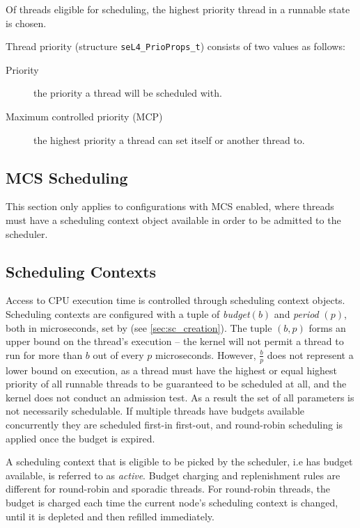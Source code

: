 Of threads eligible for scheduling, the highest priority thread in a runnable state is chosen.

Thread priority (structure \texttt{seL4\_PrioProps\_t}) consists of two values as follows:

\begin{description} \item[Priority] the priority a thread will be scheduled with.  \item[Maximum
controlled priority (MCP)] the highest priority a thread can set itself or another thread to.
\end{description}

\subsection{MCS Scheduling}

This section only applies to configurations with MCS enabled, where threads must have
a scheduling context object available in order to be admitted to the scheduler.

\subsection{Scheduling Contexts}
\label{sec:scheduling_contexts}

Access to CPU execution time is controlled through scheduling context objects.
Scheduling contexts are configured with a tuple of
\textit{budget}$(b)$ and \textit{period} $(p)$, both in microseconds, set by
 (see \autoref{sec:sc_creation}).
The tuple $(b, p)$ forms an upper bound on the thread's execution -- the kernel will not permit a
thread to run for more than $b$ out of every $p$ microseconds. However, $\frac{b}{p}$ does not
represent a lower bound on execution, as a thread must have the highest or equal highest priority
of all runnable threads to be guaranteed to be scheduled at all, and the kernel does not conduct
an admission test. As a result the set of all parameters is not necessarily schedulable. If
multiple threads have budgets available concurrently they are scheduled first-in first-out, and
round-robin scheduling is applied once the budget is expired.

A scheduling context that is eligible to be picked by the scheduler, i.e has budget available, is
referred to as \emph{active}.  Budget charging and replenishment rules are different for round-robin
and sporadic threads.  For round-robin threads, the budget is charged each time the current node's
scheduling context is changed, until it is depleted and then refilled immediately.

